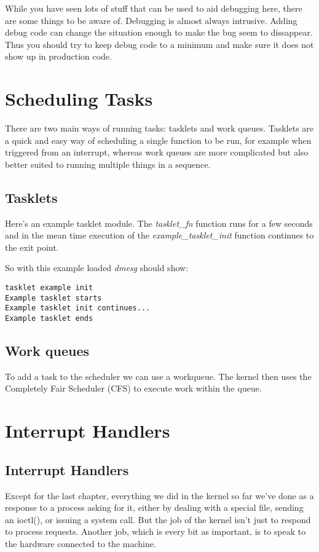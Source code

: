 \documentclass[10pt, oneside]{book}
\begin{document}
While you have seen lots of stuff that can be used to aid debugging here, there are some things to be aware of. Debugging is almost always intrusive. Adding debug code can change the situation enough to make the bug seem to dissappear. Thus you should try to keep debug code to a minimum and make sure it does not show up in production code.

\section{Scheduling Tasks}
\label{sec:orgb1eb02f}
There are two main ways of running tasks: tasklets and work queues. Tasklets are a quick and easy way of scheduling a single function to be run, for example when triggered from an interrupt, whereas work queues are more complicated but also better suited to running multiple things in a sequence.

\subsection{Tasklets}
\label{sec:org5b372fb}
Here's an example tasklet module. The \emph{tasklet\_fn} function runs for a few seconds and in the mean time execution of the \emph{example\_tasklet\_init} function continues to the exit point.


So with this example loaded \emph{dmesg} should show:

\begin{verbatim}
tasklet example init
Example tasklet starts
Example tasklet init continues...
Example tasklet ends
\end{verbatim}

\subsection{Work queues}
\label{sec:orgb4f6fbb}
To add a task to the scheduler we can use a workqueue. The kernel then uses the Completely Fair Scheduler (CFS) to execute work within the queue.


\section{Interrupt Handlers}
\label{sec:orge36fc8c}
\subsection{Interrupt Handlers}
\label{sec:org5ec1409}
Except for the last chapter, everything we did in the kernel so far we've done as a response to a process asking for it, either by dealing with a special file, sending an ioctl(), or issuing a system call. But the job of the kernel isn't just to respond to process requests. Another job, which is every bit as important, is to speak to the hardware connected to the machine.
\end{document}
